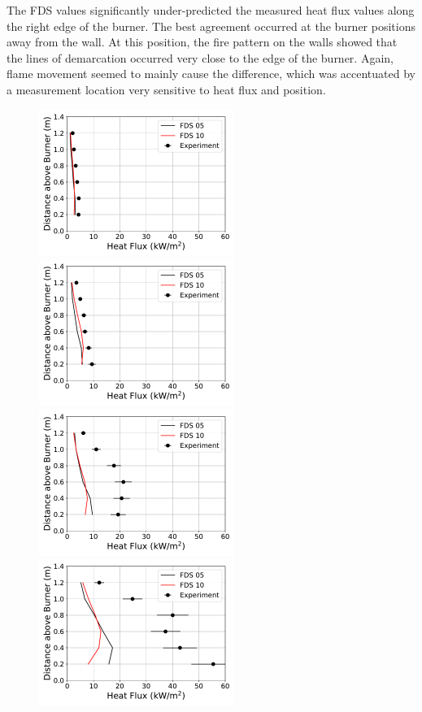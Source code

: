 \documentclass[twoside]{uocthesis}
\begin{document}
{The FDS values significantly under-predicted the measured heat flux values along the right edge of the burner.  The best agreement occurred at the burner positions away from the wall.  At this position, the fire pattern on the walls showed that the lines of demarcation occurred very close to the edge of the burner.  Again, flame movement seemed to mainly cause the difference, which was accentuated by a measurement location very sensitive to heat flux and position.           

\begin{figure}[ht!]
  \centering
  \includegraphics[width=2.5in]{../Figures/IWGB_NG_HF_Offset_Avg_2D_RI}
  \includegraphics[width=2.5in]{../Figures/IWGB_NG_HF_Offset_Avg_1D_RI}\\
  \includegraphics[width=2.5in]{../Figures/IWGB_NG_HF_Offset_Avg_0p5D_RI}
  \includegraphics[width=2.5in]{../Figures/IWGB_NG_HF_Offset_Avg_0D_RI}\\

\end{figure}}
\end{document}
